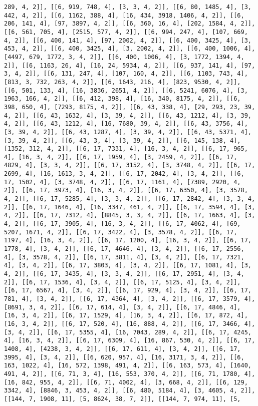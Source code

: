 \documentclass[12pt,fleqn]{article}\usepackage{../../common}
\begin{document}
\begin{verbatim}
289, 4, 2]], [[6, 919, 748, 4], [3, 3, 4, 2]], [[6, 80, 1485, 4], [3, 442, 4, 2]], [[6, 1162, 388, 4], [16, 434, 3918, 1406, 4, 2]], [[6, 206, 141, 4], [97, 3897, 4, 2]], [[6, 360, 16, 4], [202, 1584, 4, 2]], [[6, 561, 705, 4], [2515, 577, 4, 2]], [[6, 994, 247, 4], [107, 669, 4, 2]], [[6, 400, 141, 4], [97, 2002, 4, 2]], [[6, 400, 3425, 4], [3, 453, 4, 2]], [[6, 400, 3425, 4], [3, 2002, 4, 2]], [[6, 400, 1006, 4], [4497, 679, 1772, 3, 4, 2]], [[6, 400, 1006, 4], [3, 1772, 1394, 4, 2]], [[6, 1163, 26, 4], [16, 24, 5934, 4, 2]], [[6, 937, 141, 4], [97, 3, 4, 2]], [[6, 131, 247, 4], [107, 160, 4, 2]], [[6, 1103, 743, 4], [813, 3, 732, 263, 4, 2]], [[6, 1643, 216, 4], [823, 9530, 4, 2]], [[6, 501, 133, 4], [16, 3836, 2651, 4, 2]], [[6, 5241, 6076, 4], [3, 1963, 166, 4, 2]], [[6, 412, 398, 4], [16, 340, 8175, 4, 2]], [[6, 398, 650, 4], [7293, 8175, 4, 2]], [[6, 43, 338, 4], [29, 293, 23, 39, 4, 2]], [[6, 43, 1632, 4], [3, 39, 4, 2]], [[6, 43, 1212, 4], [3, 39, 4, 2]], [[6, 43, 1212, 4], [16, 7680, 39, 4, 2]], [[6, 43, 3756, 4], [3, 39, 4, 2]], [[6, 43, 1287, 4], [3, 39, 4, 2]], [[6, 43, 5371, 4], [3, 39, 4, 2]], [[6, 43, 3, 4], [3, 39, 4, 2]], [[6, 145, 138, 4], [1352, 312, 4, 2]], [[6, 17, 7331, 4], [16, 3, 4, 2]], [[6, 17, 965, 4], [16, 3, 4, 2]], [[6, 17, 1959, 4], [3, 2459, 4, 2]], [[6, 17, 4829, 4], [3, 3, 4, 2]], [[6, 17, 3152, 4], [3, 3748, 4, 2]], [[6, 17, 2699, 4], [16, 1613, 3, 4, 2]], [[6, 17, 2042, 4], [3, 4, 2]], [[6, 17, 1502, 4], [3, 3748, 4, 2]], [[6, 17, 1161, 4], [7389, 2920, 4, 2]], [[6, 17, 3973, 4], [16, 3, 4, 2]], [[6, 17, 6350, 4], [3, 3578, 4, 2]], [[6, 17, 5285, 4], [3, 3, 4, 2]], [[6, 17, 2842, 4], [3, 3, 4, 2]], [[6, 17, 1646, 4], [16, 3347, 461, 4, 2]], [[6, 17, 3594, 4], [3, 4, 2]], [[6, 17, 7312, 4], [8845, 3, 3, 4, 2]], [[6, 17, 1663, 4], [3, 4, 2]], [[6, 17, 3905, 4], [16, 3, 4, 2]], [[6, 17, 4062, 4], [69, 5207, 1671, 4, 2]], [[6, 17, 3422, 4], [3, 3578, 4, 2]], [[6, 17, 1197, 4], [16, 3, 4, 2]], [[6, 17, 1200, 4], [16, 3, 4, 2]], [[6, 17, 1778, 4], [3, 4, 2]], [[6, 17, 4646, 4], [3, 4, 2]], [[6, 17, 2556, 4], [3, 3578, 4, 2]], [[6, 17, 3811, 4], [3, 4, 2]], [[6, 17, 7321, 4], [3, 4, 2]], [[6, 17, 3803, 4], [3, 4, 2]], [[6, 17, 1081, 4], [3, 4, 2]], [[6, 17, 3435, 4], [3, 3, 4, 2]], [[6, 17, 2951, 4], [3, 4, 2]], [[6, 17, 1536, 4], [3, 4, 2]], [[6, 17, 5125, 4], [3, 4, 2]], [[6, 17, 6567, 4], [3, 4, 2]], [[6, 17, 929, 4], [3, 4, 2]], [[6, 17, 781, 4], [3, 4, 2]], [[6, 17, 4364, 4], [3, 4, 2]], [[6, 17, 3579, 4], [8691, 3, 4, 2]], [[6, 17, 614, 4], [3, 4, 2]], [[6, 17, 4846, 4], [16, 3, 4, 2]], [[6, 17, 1529, 4], [16, 3, 4, 2]], [[6, 17, 872, 4], [16, 3, 4, 2]], [[6, 17, 520, 4], [16, 888, 4, 2]], [[6, 17, 3466, 4], [3, 4, 2]], [[6, 17, 5355, 4], [16, 7043, 289, 4, 2]], [[6, 17, 4245, 4], [16, 3, 4, 2]], [[6, 17, 6309, 4], [16, 867, 530, 4, 2]], [[6, 17, 1408, 4], [4238, 3, 4, 2]], [[6, 17, 611, 4], [3, 4, 2]], [[6, 17, 3995, 4], [3, 4, 2]], [[6, 620, 957, 4], [16, 3171, 3, 4, 2]], [[6, 163, 1022, 4], [16, 572, 1398, 491, 4, 2]], [[6, 163, 573, 4], [1640, 491, 4, 2]], [[6, 71, 3, 4], [16, 553, 370, 4, 2]], [[6, 71, 1780, 4], [16, 842, 955, 4, 2]], [[6, 71, 4002, 4], [3, 668, 4, 2]], [[6, 129, 3342, 4], [8846, 3, 453, 4, 2]], [[6, 480, 5184, 4], [3, 4605, 4, 2]], [[144, 7, 1908, 11], [5, 8624, 38, 7, 2]], [[144, 7, 974, 11], [5, 
\end{verbatim}
\end{document}
